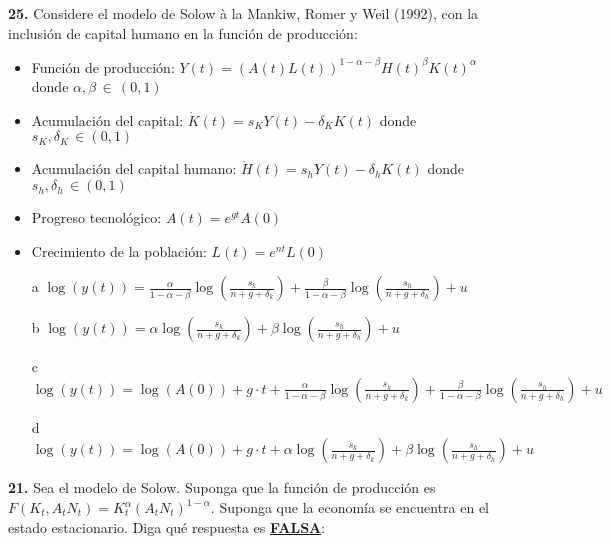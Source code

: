 \documentclass{nuevotema}
\begin{document}
\textbf{25.} Considere el modelo de Solow à la Mankiw, Romer y Weil (1992), con la inclusión de capital humano en la función de producción:

\begin{itemize}
	\item Función de producción: $Y(t) = \left( A(t) L(t) \right)^{1-\alpha-\beta} H(t)^\beta K(t)^\alpha$ donde $\alpha, \beta \, \in \, (0,1)$
	\item Acumulación del capital: $\dot{K}(t) = s_K Y(t) - \delta_K K(t)$ donde $s_K, \delta_K \, \in (0,1)$
	\item Acumulación del capital humano: $\dot{H}(t) = s_h Y(t) - \delta_h K(t)$ donde $s_h, \delta_h \, \in (0,1)$
	\item Progreso tecnológico: $A(t) = e^{gt} A(0)$
	\item Crecimiento de la población: $L(t) = e^{nt} L(0)$
\end{itemize}

\begin{itemize}
	\item[a] $\log \left( y(t) \right) = \frac{\alpha}{1-\alpha-\beta} \log \left( \frac{s_k}{n+g+\delta_k} \right) + \frac{\beta}{1-\alpha - \beta} \log \left(  \frac{s_h}{n+g+\delta_h} \right) + u$
	\item[b] $\log \left( y(t) \right) = \alpha \log \left( \frac{s_k}{n+g+\delta_k} \right) + \beta \log \left(  \frac{s_h}{n+g+\delta_h} \right) + u$
	\item[c] $\log \left( y(t) \right) = \log \left( A(0) \right) + g \cdot t + \frac{\alpha}{1 - \alpha -\beta} \log \left( \frac{s_k}{n+g+\delta_k} \right) + \frac{\beta}{1-\alpha -\beta} \log \left( \frac{s_h}{n + g + \delta_h} \right) + u$
	\item[d] $\log \left( y(t) \right) = \log \left( A(0) \right) + g \cdot t + \alpha \log \left( \frac{s_k}{n+g+\delta_k} \right) + \beta \log \left( \frac{s_h}{n+g+\delta_h} \right) + u$
\end{itemize}

\textbf{21.} Sea el modelo de Solow. Suponga que la función de producción es $F(K_t, A_t N_t) = K_t^\alpha (A_t N_t)^{1-\alpha}$. Suponga que la economía se encuentra en el estado estacionario. Diga qué respuesta es \textbf{\underline{FALSA}}:
\end{document}
